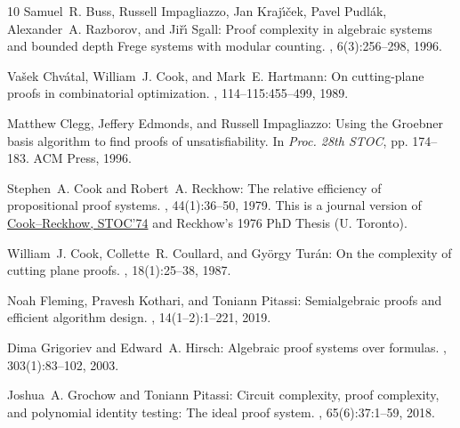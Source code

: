 \documentclass[11pt]{article}
\begin{document}
\begin{thebibliography}{10}
{\sc Samuel~R. Buss, Russell Impagliazzo, Jan Kraj{\'{\i}}{\v{c}}ek, Pavel
  Pudl{\'{a}}k, Alexander~A. Razborov, and Ji{\v{r}}{\'{\i}} Sgall}: Proof
  complexity in algebraic systems and bounded depth {F}rege systems with
  modular counting.
, 6(3):256--298, 1996.
\newblock [\epfmtdoi{10.1007/BF01294258}]

{\sc Va{\v{s}}ek Chv{\'a}tal, William~J. Cook, and Mark~E. Hartmann}: On
  cutting-plane proofs in combinatorial optimization.
, 114--115:455--499, 1989.
\newblock [\epfmtdoi{10.1016/0024-3795(89)90476-X}]

{\sc Matthew Clegg, Jeffery Edmonds, and Russell Impagliazzo}: Using the
  {G}roebner basis algorithm to find proofs of unsatisfiability.
\newblock In {\em Proc. 28th STOC}, pp. 174--183. ACM Press, 1996.
\newblock [\epfmtdoi{10.1145/237814.237860}]

{\sc Stephen~A. Cook and Robert~A. Reckhow}: The relative efficiency of
  propositional proof systems.
, 44(1):36--50, 1979.
\newblock This is a journal version of
  \href{https://doi.org/10.1145/800119.803893}{Cook--Reckhow, STOC'74} and
  Reckhow's 1976 PhD Thesis (U. Toronto).
\newblock [\epfmtdoi{10.2307/2273702}]

{\sc William~J. Cook, Collette~R. Coullard, and Gy{\"o}rgy Tur{\'a}n}: On the
  complexity of cutting plane proofs.
, 18(1):25--38, 1987.
\newblock [\epfmtdoi{10.1016/0166-218X(87)90039-4}]

{\sc Noah Fleming, Pravesh Kothari, and Toniann Pitassi}: Semialgebraic proofs
  and efficient algorithm design.
, 14(1--2):1--221, 2019.

{\sc Dima Grigoriev and Edward~A. Hirsch}: Algebraic proof systems over
  formulas.
, 303(1):83--102, 2003.

{\sc Joshua~A. Grochow and Toniann Pitassi}: Circuit complexity, proof
  complexity, and polynomial identity testing: The ideal proof system.
, 65(6):37:1--59, 2018.
\newblock [\epfmtdoi{10.1145/3230742}]


\end{thebibliography}
\end{document}
